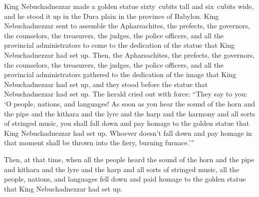 
\begin{inparaenum}
   King Nebuchadnezzar made a golden statue sixty~cubits tall and six~cubits wide, and he stood it up in the Dura plain in the province of Babylon.%
   King Nebuchadnezzar sent to assemble the Apharsachites, the prefects, the governors, the counselors, the treasurers, the judges, the police officers, and all the provincial administrators to come to the dedication of the statue that King Nebuchadnezzar had set up.%
   Then, the Apharsachites, the prefects, the governors, the counselors, the treasurers, the judges, the police officers, and all the provincial administrators gathered to the dedication of the image that King Nebuchadnezzar had set up, and they stood before the statue that Nebuchadnezzar had set up.%
   The herald cried out with force: ``They say to you: `O people, nations, and languages!%
   As soon as you hear the sound of the horn and the pipe and the kithara and the lyre and the harp and the harmony and all sorts of stringed music, you shall fall down and pay homage to the golden statue that King Nebuchadnezzar had set up.%
   Whoever doesn't fall down and pay homage in that moment shall be thrown into the fiery, burning furnace.'\thinspace''%

   Then, at that time, when all the people heard the sound of the horn and the pipe and kithara and the lyre and the harp and all sorts of stringed music, all the people, nations, and languages fell down and paid homage to the golden statue that King Nebuchadnezzar had set up.%


\end{inparaenum}
